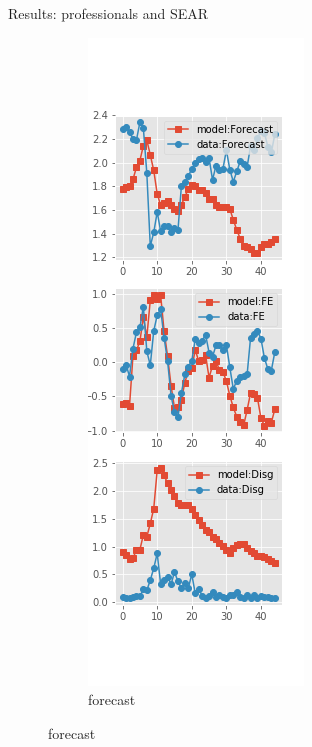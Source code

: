 \documentclass{beamer}
\begin{document}
\begin{frame}{Results: professionals and SEAR}
	\begin{figure}[ht]
		\label{SE_diag_SPF}
		\begin{subfigure}[b]{0.19\textwidth}
			\centering
			\caption{forecast}
			\includegraphics[width=\textwidth, height = 0.8\textheight]{figuresDraft/spf_se_est_diag0.png}

\end{subfigure}
\end{figure}
\end{frame}
\end{document}
